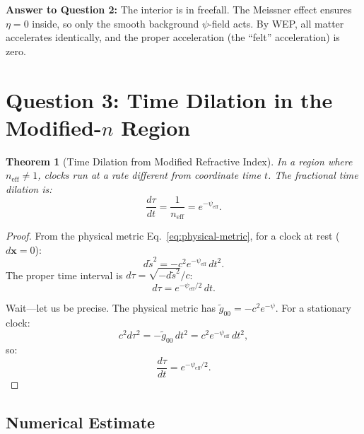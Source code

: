 \documentclass[12pt, letterpaper]{article}
\newtheorem{theorem}{Theorem}
\theoremstyle{definition}
\theoremstyle{remark}
\newcommand{\neff}{n_{\mathrm{eff}}}
\begin{document}
\textbf{Answer to Question 2:} The interior is in freefall. The Meissner
effect ensures $\eta = 0$ inside, so only the smooth background $\psi$-field
acts. By WEP, all matter accelerates identically, and the proper acceleration
(the ``felt'' acceleration) is zero.

\section{Question 3: Time Dilation in the Modified-$n$ Region}
\label{sec:Q3}

\begin{theorem}[Time Dilation from Modified Refractive Index]
In a region where $\neff \neq 1$, clocks run at a rate different from
coordinate time $t$. The fractional time dilation is:
\begin{equation}
\frac{d\tau}{dt} = \frac{1}{\neff} = e^{-\psi_{\mathrm{eff}}}.
\end{equation}
\end{theorem}

\begin{proof}
From the physical metric Eq.~\eqref{eq:physical-metric}, for a clock at rest
($d\mathbf{x} = 0$):
\begin{equation}
d\tilde{s}^2 = -c^2 e^{-\psi_{\mathrm{eff}}} \, dt^2.
\end{equation}
The proper time interval is $d\tau = \sqrt{-d\tilde{s}^2}/c$:
\begin{equation}
d\tau = e^{-\psi_{\mathrm{eff}}/2} \, dt.
\end{equation}

Wait---let us be precise. The physical metric has $\tilde{g}_{00} = -c^2 e^{-\psi}$.
For a stationary clock:
\begin{equation}
c^2 d\tau^2 = -\tilde{g}_{00} \, dt^2 = c^2 e^{-\psi_{\mathrm{eff}}} \, dt^2,
\end{equation}
so:
\begin{equation}
\boxed{\frac{d\tau}{dt} = e^{-\psi_{\mathrm{eff}}/2}.}
\label{eq:time-dilation}
\end{equation}
\end{proof}

\subsection{Numerical Estimate}
\end{document}
